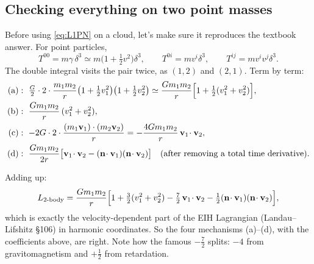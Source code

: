 \documentclass[11pt]{article}
\begin{document}
\subsection{Checking everything on two point masses}
Before using \eqref{eq:L1PN} on a cloud, let's make sure it reproduces the textbook answer. For point particles,
\[
T^{00}=m\gamma\,\delta^3\simeq m\big(1+\tfrac12v^2\big)\delta^3,\qquad T^{0i}=mv^i\delta^3,\qquad T^{ij}=mv^iv^j\delta^3.
\]
The double integral visits the pair twice, as $(1,2)$ and $(2,1)$. Term by term:
\begin{align*}
\text{(a)}&:\ \tfrac G2\cdot2\cdot\frac{m_1m_2}{r}\big(1+\tfrac12v_1^2\big)\big(1+\tfrac12v_2^2\big)\simeq\frac{Gm_1m_2}{r}\Big[1+\tfrac12(v_1^2+v_2^2)\Big],\\
\text{(b)}&:\ \frac{Gm_1m_2}{r}\,(v_1^2+v_2^2),\\
\text{(c)}&:\ -2G\cdot2\cdot\frac{(m_1\bv_1)\cdot(m_2\bv_2)}{r}=-\frac{4Gm_1m_2}{r}\,\bv_1\!\cdot\bv_2,\\
\text{(d)}&:\ \frac{Gm_1m_2}{2r}\big[\bv_1\!\cdot\bv_2-(\bn\!\cdot\bv_1)(\bn\!\cdot\bv_2)\big]\quad\text{(after removing a total time derivative)}.
\end{align*}
\begin{verify}[Sum = Einstein--Infeld--Hoffmann]
Adding up:
\[
L_{\rm 2\text{-}body}=\frac{Gm_1m_2}{r}\Big[1+\tfrac32(v_1^2+v_2^2)-\tfrac72\,\mathbf{v}_1\!\cdot\mathbf{v}_2-\tfrac12(\mathbf{n}\!\cdot\mathbf{v}_1)(\mathbf{n}\!\cdot\mathbf{v}_2)\Big],
\]
which is exactly the velocity-dependent part of the EIH Lagrangian (Landau--Lifshitz \S106) in harmonic coordinates. So the four mechanisms (a)--(d), with the coefficients above, are right. Note how the famous $-\tfrac72$ splits: $-4$ from gravitomagnetism and $+\tfrac12$ from retardation.
\end{verify}
\end{document}
